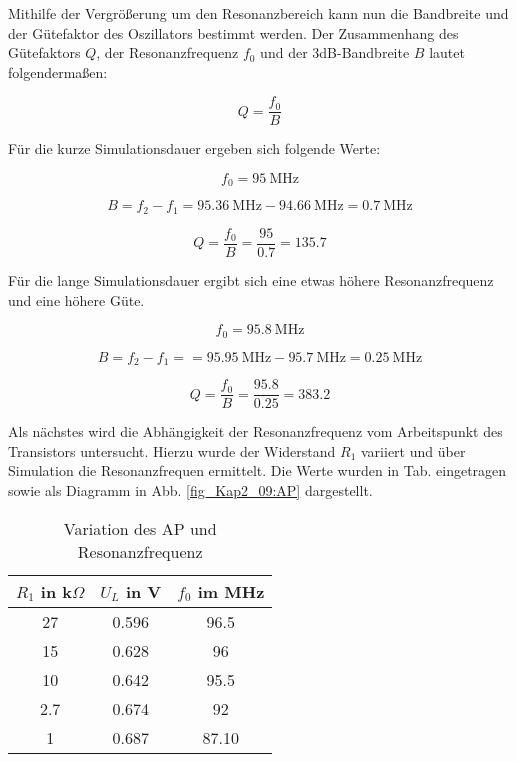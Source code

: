 Mithilfe der Vergrößerung um den Resonanzbereich kann nun die Bandbreite und der Gütefaktor des Oszillators bestimmt werden. Der Zusammenhang des Gütefaktors $Q$, der Resonanzfrequenz $f_0$ und der 3dB-Bandbreite $B$ lautet folgendermaßen:

\begin{equation}
    Q = \frac{f_0}{B}
\end{equation}

Für die kurze Simulationsdauer ergeben sich folgende Werte:

\begin{equation*}
    f_0 = \SI{95}{\mega\hertz}
\end{equation*}

\begin{equation*}
    B = f_2 - f_1 = \SI{95.36}{\mega\hertz} - \SI{94.66}{\mega\hertz} = \SI{0.7}{\mega\hertz}
\end{equation*}

\begin{equation*}
    Q = \frac{f_0}{B} = \frac{95}{0.7} = 135.7
\end{equation*}

Für die lange Simulationsdauer ergibt sich eine etwas höhere Resonanzfrequenz und eine höhere Güte.

\begin{equation*}
    f_0 = \SI{95.8}{\mega\hertz}
\end{equation*}

\begin{equation*}
    B = f_2 - f_1 =  = \SI{95.95}{\mega\hertz} - \SI{95.7}{\mega\hertz} = \SI{0.25}{\mega\hertz}
\end{equation*}

\begin{equation}
    Q = \frac{f_0}{B} = \frac{95.8}{0.25} = 383.2
\end{equation}

Als nächstes wird die Abhängigkeit der Resonanzfrequenz vom Arbeitspunkt des Transistors untersucht. Hierzu wurde der Widerstand $R_1$ variiert und über Simulation die Resonanzfrequen ermittelt. Die Werte wurden in Tab. eingetragen sowie als Diagramm in Abb. \ref{fig_Kap2_09:AP} dargestellt.

\begin{table}[H]
\centering
\begin{tabular}{|c|c|c|} \hline
$R_1$ in k$\Omega$ & $U_L$ in V & $f_0$ im MHz \\ \hline
27 & 0.596 & 96.5 \\ \hline
15 & 0.628 & 96 \\ \hline
10 & 0.642 & 95.5 \\ \hline
2.7 & 0.674 & 92 \\ \hline
1 & 0.687 & 87.10 \\ \hline
\end{tabular}
\caption{Variation des AP und Resonanzfrequenz}
\label{tab_Kap2_02:AP} 
\end{table}

